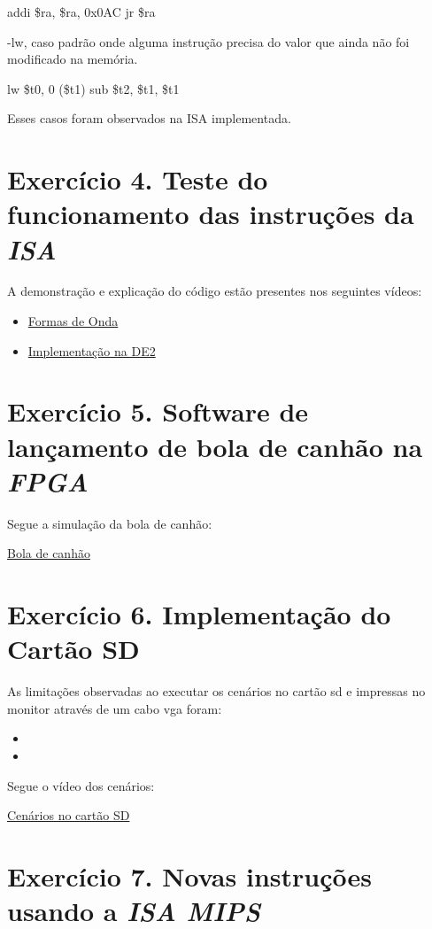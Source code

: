 \documentclass[12pt]{article}
\begin{document}
 addi \$ra, \$ra, 0x0AC 
 jr \$ra 

-lw, caso padrão onde alguma instrução precisa do valor que ainda não foi modificado na memória.

lw \$t0, 0 (\$t1)
sub \$t2, \$t1, \$t1


Esses casos foram observados na ISA implementada.

\section{Exercício 4. Teste do funcionamento das instruções da \textit{ISA} }
\label{sec:testeisa}

A demonstração e explicação do código estão presentes nos seguintes vídeos:

\begin{itemize}
\item \href{https://youtu.be/u5eFv9_BDSw}{Formas de Onda}
\item \href{https://youtu.be/PA9af2_Dhi4}{Implementação na DE2} 
\end{itemize}


\section{Exercício 5. Software de lançamento de bola de canhão na \textit{FPGA}}
\label{sec:canhao}

Segue a simulação da bola de canhão:

\href{https://youtu.be/4IZcH5GzhVk}{Bola de canhão}


\section{Exercício 6. Implementação do Cartão SD}
\label{sec:cartaosd}

As limitações observadas ao executar os cenários no cartão sd e impressas no monitor através de um cabo vga foram:

\begin{itemize}
\item 
\item 
\end{itemize} 

Segue o vídeo dos cenários:

\href{https://youtu.be/VeoxltP3L6o}{Cenários no cartão SD}

  
\section{Exercício 7. Novas instruções usando a \textit{ISA MIPS}}
\label{sec:isamips} 
\end{document}
